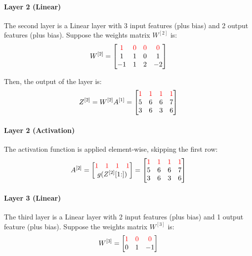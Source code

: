 \paragraph{Layer 2 (Linear)} The second layer is a Linear layer with 3 input features (plus bias) and 2 output features (plus bias). Suppose the weights matrix $W^{[2]}$ is:
\begin{equation*}
    W^{[2]} = \mqty[
        \color{red} 1 & \color{red} 0 & \color{red} 0 & \color{red} 0\\
        1 & 1 & 0 & 1\\
        -1 & 1 & 2 & -2
    ]
\end{equation*}

Then, the output of the layer is:
\begin{equation*}
    Z^{[2]} = W^{[2]} A^{[1]} = \mqty[
        \color{red} 1 & \color{red} 1 & \color{red} 1 & \color{red} 1 \\
        5 & 6 & 6 & 7 \\
        3 & 6 & 3 & 6
    ]
\end{equation*}

\paragraph{Layer 2 (Activation)} The activation function is applied element-wise, skipping the first row:
\begin{equation*}
    A^{[2]} = \mqty[
        \mqty{\color{red} 1 & \color{red} 1 & \color{red} 1 & \color{red} 1} \\
        g(Z^{[2]}[1\hspace{-0.6ex}:])
    ] = \mqty[
        \color{red} 1 & \color{red} 1 & \color{red} 1 & \color{red} 1 \\
        5 & 6 & 6 & 7 \\
        3 & 6 & 3 & 6
    ]
\end{equation*}

\paragraph{Layer 3 (Linear)} The third layer is a Linear layer with 2 input features (plus bias) and 1 output feature (plus bias). Suppose the weights matrix $W^{[3]}$ is:
\begin{equation*}
    W^{[3]} = \mqty[
        \color{red} 1 & \color{red} 0 & \color{red} 0 \\
        0 & 1 & -1
    ]
\end{equation*}

